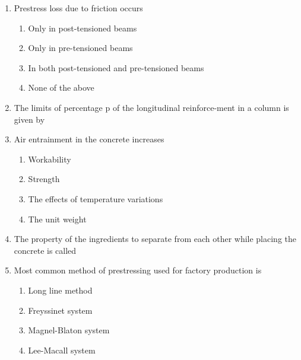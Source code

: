 \documentclass[11pt,a4paper]{article}
\begin{document}
\begin{enumerate}
\begin{enumerate}[label=\Alph*.]
\end{enumerate}
\item{Prestress loss due to friction occurs}
\begin{enumerate}[label=\Alph*.]
\item{Only in post-tensioned beams}
\item{Only in pre-tensioned beams}
\item{In both post-tensioned and pre-tensioned beams}
\item{None of the above}
\end{enumerate}
\item{The limits of percentage p of the longitudinal reinforce-ment in a column is given by}
\\
\item{Air entrainment in the concrete increases}
\begin{enumerate}[label=\Alph*.]
\item{Workability}
\item{Strength}
\item{The effects of temperature variations}
\item{The unit weight}
\end{enumerate}
\item{The property of the ingredients to separate from each other while placing the concrete is called}
\\
\item{Most common method of prestressing used for factory production is}
\begin{enumerate}[label=\Alph*.]
\item{Long line method}
\item{Freyssinet system}
\item{Magnel-Blaton system}
\item{Lee-Macall system}

\end{enumerate}
\end{enumerate}
\end{document}
